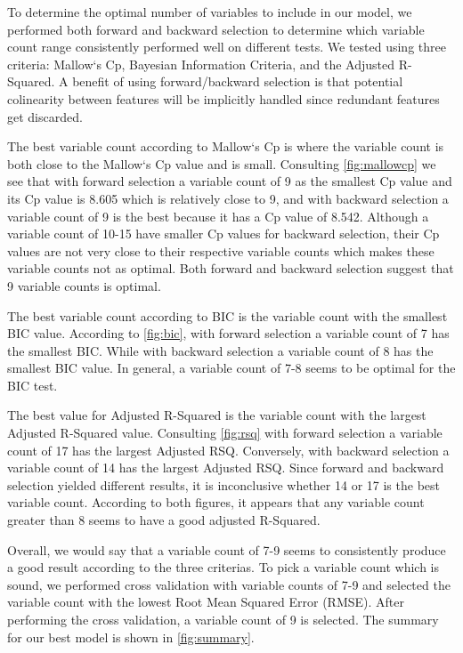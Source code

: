 To determine the optimal number of variables to include in our model, we performed both forward and backward selection to
determine which variable count range consistently performed well on different tests. We tested using three criteria: Mallow`s Cp,
Bayesian Information Criteria, and the Adjusted R-Squared. A benefit of using forward/backward selection is that potential
colinearity between features will be implicitly handled since redundant features get discarded.

The best variable count according to Mallow`s Cp is where the variable count is both close to the Mallow`s Cp value and is small.
Consulting \cref{fig:mallowcp} we see that with forward selection a variable count of 9 as the smallest Cp value and its
Cp value is 8.605 which is relatively close to 9, and with backward selection a variable count of 9 is the best because it
has a Cp value of 8.542. Although a variable count of 10-15 have smaller Cp values for backward selection, their Cp values are not
very close to their respective variable counts which makes these variable counts not as optimal. Both forward and backward
selection suggest that 9 variable counts is optimal.

The best variable count according to BIC is the variable count with the smallest BIC value. According to \cref{fig:bic}, with
forward selection a variable count of 7 has the smallest BIC. While with backward selection a variable count of 8 has the smallest
BIC value. In general, a variable count of 7-8 seems to be optimal for the BIC test.

The best value for Adjusted R-Squared is the variable count with the largest Adjusted R-Squared value. Consulting \cref{fig:rsq}
with forward selection a variable count of 17 has the largest Adjusted RSQ. Conversely, with backward selection a variable count
of 14 has the largest Adjusted RSQ. Since forward and backward selection yielded different results, it is inconclusive whether 14
or 17 is the best variable count. According to both figures, it appears that any variable count greater than 8 seems to have a
good adjusted R-Squared.

Overall, we would say that a variable count of 7-9 seems to consistently produce a good result according to the three criterias.
To pick a variable count which is sound, we performed cross validation with variable counts of 7-9 and selected the
variable count with the lowest Root Mean Squared Error (RMSE). After performing the cross validation, a variable count of 9 is selected.
The summary for our best model is shown in \cref{fig:summary}.
